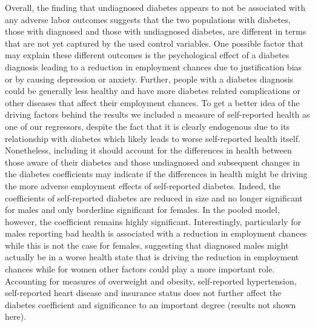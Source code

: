 \documentclass[12pt,english,british]{article}
\begin{document}
Overall, the finding that undiagnosed diabetes appears to not be associated with any adverse labor outcomes suggests that the two populations with diabetes, those with diagnosed and those with undiagnosed diabetes, are different in terms that are not yet captured by the used control variables. One possible factor that may explain these different outcomes is the psychological effect of a diabetes diagnosis leading to a reduction in employment chances due to justification bias or by causing depression or anxiety. Further, people with a diabetes diagnosis could be generally less healthy and have more diabetes related complications or other diseases that affect their employment chances. To get a better idea of the driving factors behind the results we included a measure of self-reported health as one of our regressors, despite the fact that it is clearly endogenous due to its relationship with diabetes which likely leads to worse self-reported health itself. Nonetheless, including it should account for the differences in health between those aware of their diabetes and those undiagnosed and subsequent changes in the diabetes coefficients may indicate if the differences in health might be driving the more adverse employment effects of self-reported diabetes. Indeed, the coefficients of self-reported diabetes are reduced in size and no longer significant for males and only borderline significant for females. In the pooled model, however, the coefficient remains highly significant. Interestingly, particularly for males reporting bad health is associated with a reduction in employment chances while this is not the case for females, suggesting that diagnosed males might actually be in a worse health state that is driving the reduction in employment chances while for women other factors could play a more important role. Accounting for measures of overweight and obesity, self-reported hypertension, self-reported heart disease and insurance status does not further affect the diabetes coefficient and significance to an important degree (results not shown here).
\end{document}
